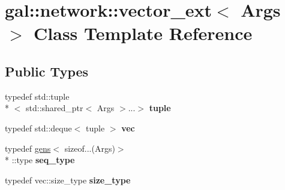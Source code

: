 \hypertarget{classgal_1_1network_1_1vector__ext}{\section{gal\-:\-:network\-:\-:vector\-\_\-ext$<$ Args $>$ Class Template Reference}
\label{classgal_1_1network_1_1vector__ext}
}
\subsection*{Public Types}
\begin{DoxyCompactItemize}
\item 
\hypertarget{classgal_1_1network_1_1vector__ext_a43f948bb7b6e59852f6412a54c161287}{typedef std\-::tuple\\*
$<$ std\-::shared\-\_\-ptr$<$ Args $>$...$>$ {\bfseries tuple}}\label{classgal_1_1network_1_1vector__ext_a43f948bb7b6e59852f6412a54c161287}

\item 
\hypertarget{classgal_1_1network_1_1vector__ext_a1954fce41858f6273a6718940547a337}{typedef std\-::deque$<$ tuple $>$ {\bfseries vec}}\label{classgal_1_1network_1_1vector__ext_a1954fce41858f6273a6718940547a337}

\item 
\hypertarget{classgal_1_1network_1_1vector__ext_a69bfb7e937959532d332fc8e88e03573}{typedef \hyperlink{structgens}{gens}$<$ sizeof...(Args)$>$\\*
\-::type {\bfseries seq\-\_\-type}}\label{classgal_1_1network_1_1vector__ext_a69bfb7e937959532d332fc8e88e03573}

\item 
\hypertarget{classgal_1_1network_1_1vector__ext_ac7c4f1bf0d33c52667c1cf6afefa9f3c}{typedef vec\-::size\-\_\-type {\bfseries size\-\_\-type}}\label{classgal_1_1network_1_1vector__ext_ac7c4f1bf0d33c52667c1cf6afefa9f3c}

\end{DoxyCompactItemize}
